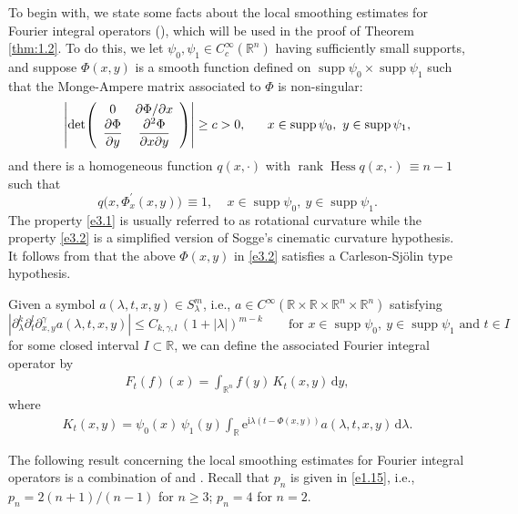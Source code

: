 \documentclass[11pt]{amsproc}
\newcommand{\R}{\mathbb{R}}
\newcommand{\e}{\mathrm{e}}
\newcommand{\supp}{\mathop{\mathrm{supp}}}
\newcommand{\rank}{\mathop{\mathrm{rank}}}
\newcommand{\Hess}{\mathop{\mathrm{Hess}}}
\newcommand{\0}{\mathbf{0}}
\renewcommand{\i}{\mathrm{i}}
\renewcommand{\d}{\mathrm{d}}
\numberwithin{equation}{section}
\numberwithin{figure}{section}
\theoremstyle{definition}
\theoremstyle{remark}
\numberwithin{thm}{section}
\begin{document}
To begin with, we state some facts about the local smoothing estimates for Fourier integral operators (\cite[Chapter 8]{So1}), which will be used in the proof of Theorem \ref{thm:1.2}.
To do this, we  let  $\psi_0,\psi_1\in C_c^\infty(\R^n)$  having sufficiently small supports, and suppose     $\Phi(x,y)$ is a smooth function defined on $\supp\psi_0\times\supp\psi_1$ such that the Monge-Ampere matrix associated to  $\Phi$  is non-singular:
\begin{equation}\label{e3.1}
\left|\det \!\left(\begin{array}{cc}
0 & \partial\Phi/\partial x \\
\displaystyle{\partial\Phi\over\partial y} & \displaystyle{\partial^2\Phi\over\partial x\partial y}
\end{array}\right)\right|\geq c>0, \ \ \ \ \ x\in\supp \psi_0,\ y\in\supp\psi_1,
\end{equation}
and there is a homogeneous function $q(x, \cdot)$ with $\rank \Hess q(x, \cdot)\,\equiv n-1$ such that
\begin{equation}\label{e3.2}
q\big(x,  \Phi_x^{'} (x,y)\big)\,\equiv 1, \ \ \ \ \ x\in\supp \psi_0, \ y\in\supp\psi_1.
\end{equation}
The  property \eqref{e3.1} is usually referred to as rotational curvature while the property
\eqref{e3.2} is a simplified version of Sogge's cinematic curvature hypothesis. It follows from \cite[p. 354]{So2} that the above $\Phi(x,y)$ in \eqref{e3.2} satisfies a Carleson-Sj\"olin type hypothesis.

Given a symbol $a(\lambda,t,x,y)\in S^m_\lambda$, i.e., $a\in C^\infty(\R\times\R\times\R^n\times\R^n)$ satisfying
\begin{equation}\label{e4.2.1}
|\partial^k_\lambda \partial^l_t\partial^\gamma_{x,y} a(\lambda,t,x,y)|\leq C_{k,\gamma,l}\,(1+|\lambda|)^{m-k}\qquad\mbox{for }x\in\supp\psi_0,\ y\in\supp\psi_1\mbox{ and }t\in I
\end{equation}
for some closed interval $I\subset\R$, we can define the associated Fourier integral operator by
\begin{eqnarray*}
F_t(f)(x)= \int_{\R^n} f(y)\,K_{t}(x,y)\,\d y,
\end{eqnarray*}
where
\begin{eqnarray}\label{e3.3}
K_{t}(x,y)=\psi_0(x) \,\psi_1(y)  \int_\R \e^{\i\lambda(t-\Phi(x,y))}a(\lambda,t,x,y)\,\d\lambda.
\end{eqnarray}


The following result concerning the local smoothing estimates for Fourier integral operators is a combination of \cite[Proposition 3.2]{BeHiSo} and  \cite[Theorem 1.4]{GaLiMiXi}. Recall that  $p_n$ is given in \eqref{e1.15}, i.e.,
$p_n={2(n+1)/ (n-1)} $ for $n\geq 3$;    $p_n=4$  for $n=2$.
\end{document}
